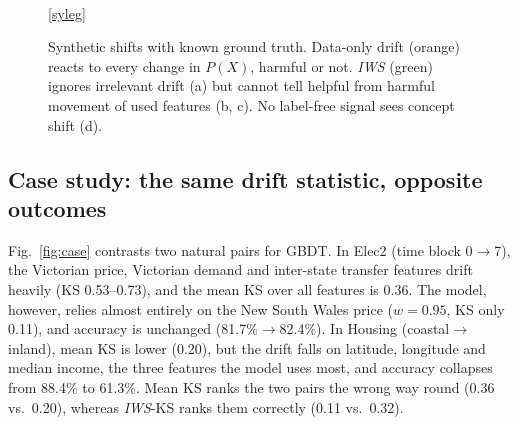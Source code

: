\documentclass[conference]{IEEEtran}
\theoremstyle{plainhead}
\newcommand{\iws}{\textit{IWS}}
\begin{document}
\begin{figure}[t]
\begin{center}
\\[2pt]
\ref{syleg}
\end{center}
\caption{Synthetic shifts with known ground truth. Data-only drift (orange) reacts to every change in $P(X)$, harmful or not. \iws{} (green) ignores irrelevant drift (a) but cannot tell helpful from harmful movement of used features (b, c). No label-free signal sees concept shift (d).}
\label{fig:synth}
\end{figure}

\subsection{Case study: the same drift statistic, opposite outcomes}
Fig.~\ref{fig:case} contrasts two natural pairs for GBDT. In Elec2 (time block 0$\to$7), the Victorian price, Victorian demand and inter-state transfer features drift heavily (KS 0.53--0.73), and the mean KS over all features is 0.36. The model, however, relies almost entirely on the New South Wales price ($w=0.95$, KS only 0.11), and accuracy is unchanged (81.7\%$\to$82.4\%). In Housing (coastal$\to$inland), mean KS is lower (0.20), but the drift falls on latitude, longitude and median income, the three features the model uses most, and accuracy collapses from 88.4\% to 61.3\%. Mean KS ranks the two pairs the wrong way round (0.36 vs.\ 0.20), whereas \iws{}-KS ranks them correctly (0.11 vs.\ 0.32).
\end{document}
